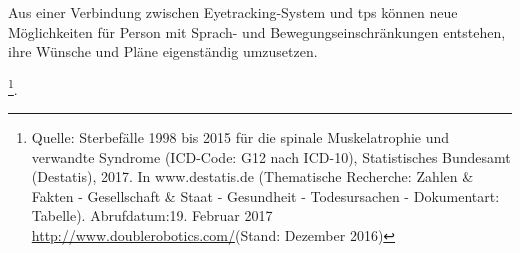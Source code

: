 Aus einer Verbindung zwischen Eyetracking-System und \acs{tps} können neue Möglichkeiten für Person mit Sprach- und Bewegungseinschränkungen entstehen, ihre Wünsche und Pläne eigenständig umzusetzen. 

\footnote{Quelle: Sterbefälle 1998 bis 2015 für die spinale Muskelatrophie und verwandte Syndrome (ICD-Code: G12 nach ICD-10), Statistisches Bundesamt (Destatis), 2017. In www.destatis.de (Thematische Recherche: Zahlen \& Fakten - Gesellschaft \& Staat - Gesundheit - Todesursachen - Dokumentart: Tabelle). Abrufdatum:19. Februar 2017 \url{http://www.doublerobotics.com/}(Stand: Dezember 2016)}.

